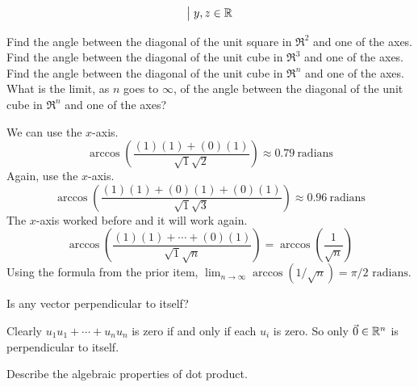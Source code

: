 \begin{exercises}
\begin{answer}
\begin{equation*}
{               \bigm|y,z\in\mathbb{R}}
      \end{equation*}  
    \end{answer}
  \recommended \item
    \begin{exparts}
      \partsitem  Find the angle between the diagonal of the unit square in
        \( \Re^2 \) and one of the axes.
      \partsitem  Find the angle between the diagonal of the unit cube in
        \( \Re^3 \) and one of the axes.
      \partsitem  Find the angle between the diagonal of the unit cube in
        \( \Re^n \) and one of the axes.
      \partsitem  What is the limit, as \( n \) goes to \( \infty \),
        of the angle between the diagonal of the unit cube in \( \Re^n \)
        and one of the axes?
    \end{exparts}
    \begin{answer}
      \begin{exparts}
        \partsitem We can use the \( x \)-axis.
          \begin{equation*}
            \arccos (\frac{(1)(1)+(0)(1)}{\sqrt{1}\sqrt{2}})
            \approx 0.79~\text{radians}
          \end{equation*}
        \partsitem Again, use the \( x \)-axis.
          \begin{equation*}
            \arccos (\frac{(1)(1)+(0)(1)+(0)(1)}{\sqrt{1}\sqrt{3}})
            \approx 0.96~\text{radians}
          \end{equation*}
        \partsitem The \( x \)-axis worked before and it will work again.
          \begin{equation*}
            \arccos (\frac{(1)(1)+\cdots+(0)(1)}{\sqrt{1}\sqrt{n}})
            =\arccos (\frac{1}{\sqrt{n}})
          \end{equation*}
        \partsitem Using the formula from the prior item,
            $\lim_{n\to\infty} \arccos(1/\sqrt{n})
              =\pi/2\text{\ radians}$.
      \end{exparts}  
    \end{answer}
  \item  
    Is any vector perpendicular to itself?
    \begin{answer}
      Clearly \( u_1u_1+\cdots+u_nu_n \) is zero if and only if
      each \( u_i \) is zero.
      So only \( \vec{0}\in\mathbb{R}^n \) is perpendicular to itself.  
    \end{answer}
  \recommended \item \label{exer:AlgPropsDotProd}  
    Describe the algebraic properties of dot product.

\end{exercises}
